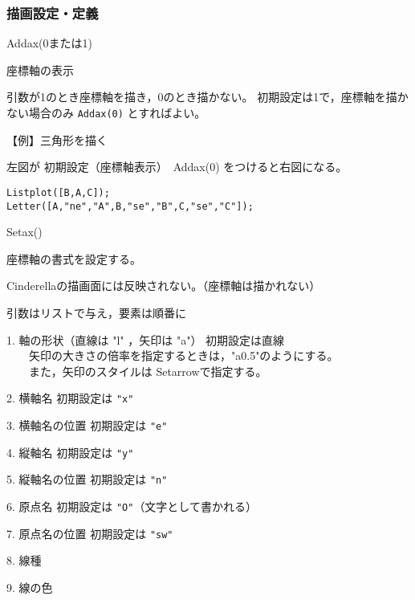 \documentclass[papersize,a4paper,10pt,uplatex]{jsarticle}
\begin{document}
\subsubsection{描画設定・定義}

\vspace{\baselineskip}
\begin{description}
\hypertarget{addax}{}
\item[関数]Addax(0または1)
\item[機能]座標軸の表示
\item[説明]引数が1のとき座標軸を描き，0のとき描かない。
初期設定は1で，座標軸を描かない場合のみ \verb|Addax(0)| とすればよい。

\vspace{\baselineskip}
【例】三角形を描く

左図が 初期設定（座標軸表示）　Addax(0) をつけると右図になる。

\begin{verbatim}
Listplot([B,A,C]);
Letter([A,"ne","A",B,"se","B",C,"se","C"]);
\end{verbatim}

\vspace{\baselineskip}
\hspace{10mm} 


\hypertarget{setax}{}
\item[関数]Setax()
\item[機能]座標軸の書式を設定する。
\item[説明]Cinderellaの描画面には反映されない。（座標軸は描かれない）

引数はリストで与え，要素は順番に

1. 軸の形状（直線は "l" ，矢印は "a"） 初期設定は直線\\
　　矢印の大きさの倍率を指定するときは，"a0.5"のようにする。\\
　　また，矢印のスタイルは Setarrowで指定する。

2. 横軸名 初期設定は \verb|"x"|

3. 横軸名の位置 初期設定は \verb|"e"|

4. 縦軸名 初期設定は \verb|"y"|

5. 縦軸名の位置 初期設定は \verb|"n"|

6. 原点名 初期設定は \verb|"O"|（文字として書かれる）

7. 原点名の位置 初期設定は \verb|"sw"|

8. 線種

9. 線の色


\end{description}
\end{document}
